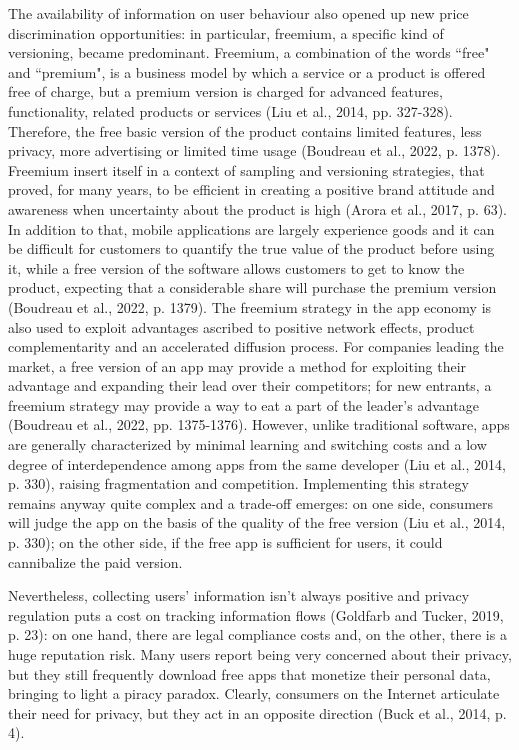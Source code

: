 The availability of information on user behaviour also opened up new price discrimination opportunities: in particular, freemium, a specific kind of versioning, became predominant. Freemium, a combination of the words ``free" and ``premium", is a business model by which a service or a product is offered free of charge, but a premium version is charged for advanced features, functionality, related products or services (Liu et al., 2014, pp. 327-328). Therefore, the free basic version of the product contains limited features, less privacy, more advertising or limited time usage (Boudreau et al., 2022, p. 1378). Freemium insert itself in a context of sampling and versioning strategies, that proved, for many years, to be efficient in  creating a positive brand attitude and awareness when uncertainty about the product is high (Arora et al., 2017, p. 63). In addition to that, mobile applications are largely experience goods and it can be difficult for customers to quantify the true value of the product before using it, while a free version of the software allows customers to get to know the product, expecting that a considerable share will purchase the premium version (Boudreau et al., 2022, p. 1379). The freemium strategy in the app economy is also used to exploit advantages ascribed to positive network effects, product complementarity and an accelerated diffusion process. For companies leading the market, a free version of an app may provide a method for exploiting their advantage and expanding their lead over their competitors; for new entrants, a freemium strategy may provide a way to eat a part of the leader's advantage (Boudreau et al., 2022, pp. 1375-1376). However, unlike traditional software, apps are generally characterized by minimal learning and switching costs and a low degree of interdependence among apps from the same developer (Liu et al., 2014, p. 330), raising fragmentation and competition. Implementing this strategy remains anyway quite complex and a trade-off emerges: on one side, consumers will judge the app on the basis of the quality of the free version (Liu et al., 2014, p. 330); on the other side, if the free app is sufficient for users, it could cannibalize the paid version.

Nevertheless, collecting users' information isn't always positive and privacy regulation puts a cost on tracking information flows (Goldfarb and Tucker, 2019, p. 23): on one hand, there are legal compliance costs and, on the other, there is a huge reputation risk. Many users report being very concerned about their privacy, but they still frequently download free apps that monetize their personal data, bringing to light a piracy paradox. Clearly, consumers on the Internet articulate their need for privacy, but they act in an opposite direction (Buck et al., 2014, p. 4).
 
